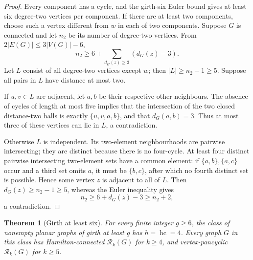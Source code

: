 \documentclass[11pt]{article}
\newtheorem{theorem}{Theorem}[section]
\theoremstyle{remark}
\newcommand{\Rk}{\mathcal R_k}
\newcommand{\hc}{\operatorname{hc}}
\numberwithin{equation}{section}
\begin{document}
\begin{proof}
Every component has a cycle, and the girth-six Euler bound gives at
least six degree-two vertices per component.  If there are at least two
components, choose such a vertex different from $w$ in each of two
components.  Suppose $G$ is connected and let $n_2$ be its number of
degree-two vertices.  From $2|E(G)|\le3|V(G)|-6$,
\[
 n_2\ge6+\sum_{d_G(z)\ge3}(d_G(z)-3).
\]
Let $L$ consist of all degree-two vertices except $w$; then
$|L|\ge n_2-1\ge5$.  Suppose all pairs in $L$ have distance at
most two.

If $u,v\in L$ are adjacent, let $a,b$ be their respective other
neighbours.  The absence of cycles of length at most five implies that
the intersection of the two closed distance-two balls is exactly
$\{u,v,a,b\}$, and that $d_G(a,b)=3$.  Thus at most three of
these vertices can lie in $L$, a contradiction.

Otherwise $L$ is independent.  Its two-element neighbourhoods are
pairwise intersecting; they are distinct because there is no four-cycle.
At least four distinct pairwise intersecting two-element sets have a
common element: if $\{a,b\},\{a,c\}$ occur and a third set omits
$a$, it must be $\{b,c\}$, after which no fourth distinct set is
possible.  Hence some vertex $z$ is adjacent to all of $L$.
Then $d_G(z)\ge n_2-1\ge5$, whereas the Euler inequality gives
\[
 n_2\ge6+d_G(z)-3\ge n_2+2,
\]
a contradiction.
\end{proof}

\begin{theorem}[Girth at least six]
\label{thm:girth6-hc}
For every finite integer $g\ge6$, the class of nonempty planar graphs
of girth at least $g$ has $h=\hc=4$.  Every graph $G$ in this
class has Hamilton-connected $\Rk(G)$ for $k\ge4$, and
vertex-pancyclic $\Rk(G)$ for $k\ge5$.
\end{theorem}
\end{document}
